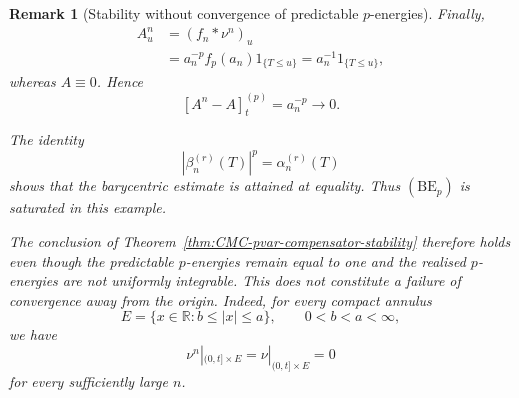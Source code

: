 \documentclass[a4paper,10pt]{article}
\newtheorem{rema}[thm]{Remark}
\begin{document}
\begin{rema}[Stability without convergence of predictable \(p\)-energies]
Finally,
\[
\begin{aligned}
A_u^n
&=
(f_n*\nu^n)_u\\
&=
a_n^{-p}f_p(a_n)1_{\{T\le u\}}=
a_n^{-1}1_{\{T\le u\}},
\end{aligned}
\]
whereas \(A\equiv0\). Hence
\[
        [A^n-A]^{(p)}_t
        =
        a_n^{-p}
        \longrightarrow0.
\]

The identity
\[
        |\beta_n^{(r)}(T)|^p
        =
        \alpha_n^{(r)}(T)
\]
shows that the barycentric estimate is attained at equality. Thus
\((\mathrm{BE}_p)\) is saturated in this example.

The conclusion of
Theorem~\ref{thm:CMC-pvar-compensator-stability} therefore holds even
though the predictable \(p\)-energies remain equal to one and the
realised \(p\)-energies are not uniformly integrable. This does not
constitute a failure of convergence away from the origin. Indeed, for
every compact annulus
\[
        E=\{x\in\mathbb R:b\le |x|\le a\},
        \qquad 0<b<a<\infty,
\]
we have
\[
        \nu^n|_{(0,t]\times E}
        =
        \nu|_{(0,t]\times E}
        =
        0
\]
for every sufficiently large \(n\).
\end{rema}
\end{document}
